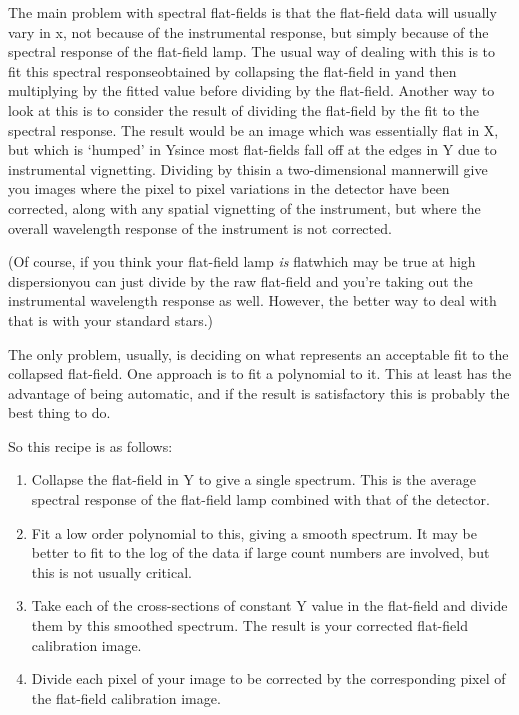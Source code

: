 \begin{latexonly}
\begin{figure}[htb]
\begin{center}
\leavevmode{}
\end{center}
\end{figure}
\end{latexonly}

   The main problem with spectral flat-fields is that the flat-field
   data will usually vary in x, not because of the instrumental
   response, but simply because of the spectral response of the
   flat-field lamp.  The usual way of dealing with this is to fit this
   spectral response\latorhtm{---}{-}obtained by collapsing the flat-field in
   y\latorhtm{---}{-}and then multiplying by the fitted value before dividing
   by the flat-field.  Another way to look at this is to consider the result of
   dividing the flat-field by the fit to the spectral response.  The
   result would be an image which was essentially flat in X, but which
   is `humped' in Y\latorhtm{---}{-}since most flat-fields fall off at the
   edges in Y due to instrumental vignetting.  Dividing by
   this\latorhtm{---}{-}in a two-dimensional manner\latorhtm{---}{-}will give
   you images where the pixel to
   pixel variations in the detector have been corrected, along with any
   spatial vignetting of the instrument, but where the overall
   wavelength response of the instrument is not corrected.

   (Of course, if you think your flat-field lamp {\em is\/}
   flat\latorhtm{---}{-}which may be true at high
   dispersion\latorhtm{---}{-}you can just divide by
   the raw flat-field and you're taking out the instrumental wavelength
   response as well.  However, the better way to deal with that is with
   your standard stars.)

   The only problem, usually, is deciding on what represents an
   acceptable fit to the collapsed flat-field.  One approach is to fit a
   polynomial to it.  This at least has the advantage of being
   automatic, and if the result is satisfactory this is probably the
   best thing to do.

   So this recipe is as follows:

\begin{enumerate}
\item
   Collapse the flat-field in Y to give a single spectrum.  This is the
   average spectral response of the flat-field lamp combined with that
   of the detector.
\item
   Fit a low order polynomial to this, giving a smooth spectrum.  It may
   be better to fit to the log of the data if large count numbers are
   involved, but this is not usually critical.
\item
   Take each of the cross-sections of constant Y value in the flat-field
   and divide them by this smoothed spectrum.  The result is your
   corrected flat-field calibration image.
\item
   Divide each pixel of your image to be corrected by the corresponding
   pixel of the flat-field calibration image.
\end{enumerate}


